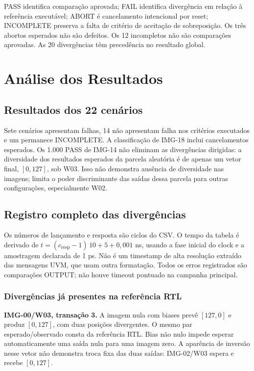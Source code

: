 \documentclass[12pt,a4paper]{article}
\begin{document}
PASS identifica comparação aprovada; FAIL identifica divergência em relação à referência executável; ABORT é cancelamento intencional por reset; INCOMPLETE preserva a falta de critério de aceitação de sobreposição. Os três abortos esperados não são defeitos. Os 12 incompletos não são comparações aprovadas. As 20 divergências têm precedência no resultado global.

\section{Análise dos Resultados}
\subsection{Resultados dos 22 cenários}


Sete cenários apresentam falhas, 14 não apresentam falha nos critérios executados e um permanece INCOMPLETE. A classificação de IMG-18 inclui cancelamentos esperados. Os 1.000 PASS de IMG-14 não eliminam as divergências dirigidas: a diversidade dos resultados esperados da parcela aleatória é de apenas um vetor final, $[0,127]$, sob W03. Isso não demonstra ausência de diversidade nas imagens; limita o poder discriminante das saídas dessa parcela para outras configurações, especialmente W02.

\subsection{Registro completo das divergências}

Os números de lançamento e resposta são ciclos do CSV. O tempo da tabela é derivado de $t=(c_{\mathrm{resp}}-1)\,10+5+0,001$ ns, usando a fase inicial do clock e a amostragem declarada de 1 ps. Não é um timestamp de alta resolução extraído das mensagens UVM, que usam outra formatação. Todos os erros registrados são comparações OUTPUT; não houve timeout pontuado na campanha principal.

\subsubsection{Divergências já presentes na referência RTL}
\textbf{IMG-00/W03, transação 3.} A imagem nula com biases prevê $[127,0]$ e produz $[0,127]$, com duas posições divergentes. O mesmo par esperado/observado consta da referência RTL. Bias não nulo impede esperar automaticamente uma saída nula para uma imagem zero. A aparência de inversão nesse vetor não demonstra troca fixa das duas saídas: IMG-02/W03 espera e recebe $[0,127]$.
\end{document}
